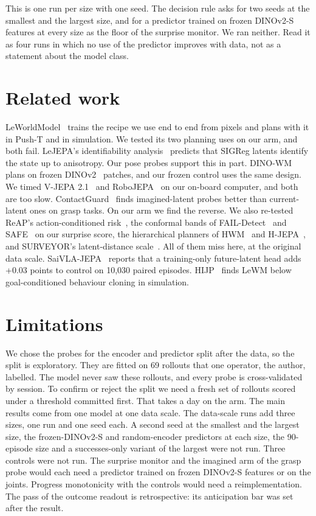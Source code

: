 \documentclass[10pt,twocolumn]{article}
\begin{document}
This is one run per size with one seed. The decision rule asks for two seeds at the smallest and the largest size, and for a predictor trained on frozen DINOv2-S features at every size as the floor of the surprise monitor. We ran neither. Read it as four runs in which no use of the predictor improves with data, not as a statement about the model class.


\section{Related work}


LeWorldModel~\citep{maes2026lewm} trains the recipe we use end to end from pixels and plans with it in Push-T and in simulation. We tested its two planning uses on our arm, and both fail. LeJEPA's identifiability analysis~\citep{klindt2026lejepa} predicts that SIGReg latents identify the state up to anisotropy. Our pose probes support this in part. DINO-WM~\citep{zhou2024dinowm} plans on frozen DINOv2~\citep{oquab2023dinov2} patches, and our frozen control uses the same design. We timed V-JEPA 2.1~\citep{murlabadia2026vjepa21} and RoboJEPA~\citep{zholus2026robojepa} on our on-board computer, and both are too slow. ContactGuard~\citep{zheng2026contactguard} finds imagined-latent probes better than current-latent ones on grasp tasks. On our arm we find the reverse. We also re-tested ReAP's action-conditioned risk~\citep{liu2026reap}, the conformal bands of FAIL-Detect~\citep{xu2025faildetect} and SAFE~\citep{gu2025safe} on our surprise score, the hierarchical planners of HWM~\citep{zhang2026hwm} and H-JEPA~\citep{zhang2026hjepa}, and SURVEYOR's latent-distance scale~\citep{surveyor2026}. All of them miss here, at the original data scale. SaiVLA-JEPA~\citep{xiao2026saivla} reports that a training-only future-latent head adds +0.03 points to control on 10,030 paired episodes. HIJP~\citep{hijp2026} finds LeWM below goal-conditioned behaviour cloning in simulation.


\section{Limitations}


We chose the probes for the encoder and predictor split after the data, so the split is exploratory. They are fitted on 69 rollouts that one operator, the author, labelled. The model never saw these rollouts, and every probe is cross-validated by session. To confirm or reject the split we need a fresh set of rollouts scored under a threshold committed first. That takes a day on the arm. The main results come from one model at one data scale. The data-scale runs add three sizes, one run and one seed each. A second seed at the smallest and the largest size, the frozen-DINOv2-S and random-encoder predictors at each size, the 90-episode size and a successes-only variant of the largest were not run. Three controls were not run. The surprise monitor and the imagined arm of the grasp probe would each need a predictor trained on frozen DINOv2-S features or on the joints. Progress monotonicity with the controls would need a reimplementation. The pass of the outcome readout is retrospective: its anticipation bar was set after the result.
\end{document}
